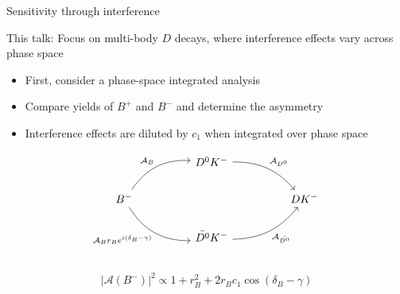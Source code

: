 \documentclass{beamer}
\begin{document}
\begin{frame}[fragile]{Sensitivity through interference}
  \begin{center}
    This talk: Focus on multi-body $D$ decays, where interference effects vary across phase space
  \end{center}
  \begin{itemize}
    \setlength\itemsep{0.5em}
    \item{First, consider a phase-space integrated analysis}
    \item{Compare yields of $B^+$ and $B^-$ and determine the asymmetry}
    \item{Interference effects are diluted by $c_1$ when integrated over phase space}
  \end{itemize}
  \begin{equation*}
    \begin{tikzcd}[column sep=huge]
      & D^0K^- \arrow[dr, bend left = 25, "\mathcal{A}_{D^0}"] & \\
      B^- \arrow[ur, bend left, "\mathcal{A}_B"] \arrow[dr, bend right, "\mathcal{A}_B r_B e^{i(\delta_B - \gamma)}"'] & [5cm] & DK^- \\
      & \bar{D^0}K^- \arrow[ur, bend right = 25, "\mathcal{A}_{\bar{D^0}}"'] & \\
    \end{tikzcd}
  \end{equation*}
  \vspace{-0.7cm}
  \begin{equation*}
    \lvert\mathcal{A}(B^-)\lvert^2\propto1 + r_B^2 + 2r_Bc_1\cos(\delta_B - \gamma)
  \end{equation*}
\end{frame}
\end{document}
